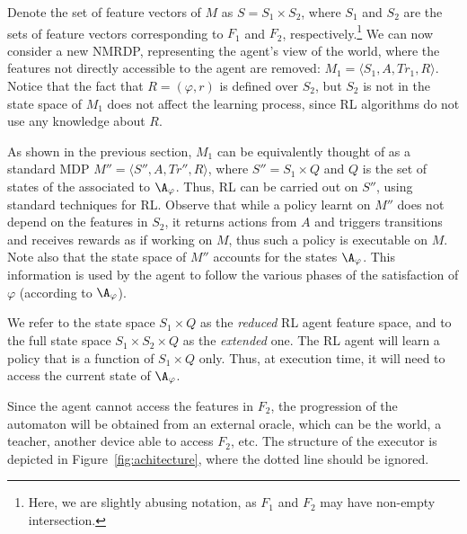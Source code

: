 Denote the set of feature vectors of $M$
as $S=S_1 \times S_2$, where $S_1$ and $S_2$ are the sets of feature vectors corresponding to
$F_1$ and $F_2$, respectively.\footnote{Here, we are slightly 
	abusing notation, as $F_1$ and $F_2$ may have non-empty intersection.}
We can now consider a new NMRDP, representing the agent's 
view of the world, where the features not directly accessible 
to the agent are removed:
${M_1} = \langle S_1, A, Tr_1, R\rangle$.
Notice that the fact that $R=(\varphi,r)$ is defined over $S_2$, but $S_2$ is not
in the state space of ${M_1}$ does not affect the learning process, since RL algorithms do not use any knowledge about $R$.

As shown in the previous section, $M_1$ can be 
equivalently thought of as a standard 
MDP $M'' = \langle S'', A, Tr'', R \rangle$, 
where $S''=S_1 \times Q$ and $Q$ is the 
set of states of the \DFA  associated to $\A_\varphi$.
Thus, RL can be carried out on $S''$, 
using standard techniques for RL. 
Observe that while a policy learnt on $M''$ does not depend on the features in $S_2$, 
it returns actions from $A$ and triggers transitions and receives rewards as if
working on $M$, thus such a policy is executable on $M$.
Note also that the state space of ${M''}$ accounts for the states $\A_\varphi$. 
This information is used by the agent to follow the various phases of  the 
satisfaction of $\varphi$ (according to $\A_\varphi$).

We refer to the state space $S_1 \times Q$ as the \emph{reduced} RL agent feature space, and to the full state space $S_1 \times S_2 \times Q$ as the \emph{extended} one.
The RL agent will learn a policy that is a function of $S_1 \times Q$
only. Thus,  at execution time, it will need to access the current state of 
$\A_\varphi$.

Since the agent cannot access the features in $F_2$, the progression of the automaton
will be obtained from an external oracle, which can be the world, a
teacher, another device able to access $F_2$, etc. The structure of
the executor is depicted in Figure~\ref{fig:achitecture}, where the
dotted line should be ignored.

